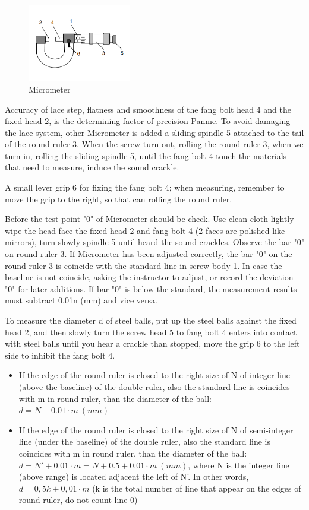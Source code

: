 \begin{figure}
    \includegraphics[width=0.4\textwidth]{figures/micrometer.png}
    \captionsetup{justification=raggedright}
    \caption{Micrometer}
    \label{fig:micrometer}
\end{figure}
Accuracy of lace step, flatness and smoothness of the fang bolt head 4 and the fixed head 2, is the determining factor of precision Panme. To avoid damaging the lace system, other Micrometer is added a sliding spindle 5 attached to the tail of the round ruler 3. When the screw turn out, rolling the round ruler 3, when we turn in, rolling the sliding spindle 5, until the fang bolt 4 touch the materials that need to measure, induce the sound crackle. \par
A small lever grip 6 for fixing the fang bolt 4; when measuring, remember to move the grip to the right, so that can rolling the round ruler. \par
Before the test point "0" of Micrometer should be check. Use clean cloth lightly wipe the head face the fixed head 2 and fang bolt 4 (2 faces are polished like mirrors), turn slowly spindle 5 until heard the sound crackles. Observe the bar "0" on round ruler 3. If Micrometer has been adjusted correctly, the bar "0" on the round ruler 3 is coincide with the standard line in screw body 1. In case the baseline is not coincide, asking the instructor to adjust, or record the deviation "0" for later additions. If bar "0" is below the standard, the measurement results must subtract 0,01n (mm) and vice versa. \par
To measure the diameter d of steel balls, put up the steel balls against the fixed head 2, and then slowly turn the screw head 5 to fang bolt 4 enters into contact with steel balls until you hear a crackle than stopped, move the grip 6 to the left side to inhibit the fang bolt 4.
\begin{itemize}
    \item If the edge of the round ruler is closed to the right size of N of integer line (above the baseline) of the double ruler, also the standard line is coincides with m in round ruler, than the diameter of the ball: $d = N + 0.01 \cdot m ~(mm)$
    \item If the edge of the round ruler is closed to the right size of N of semi-integer line (under the baseline) of the double ruler, also the standard line is coincides with m in round ruler, than the diameter of the ball: $d=N' + 0.01 \cdot m = N + 0.5 + 0.01 \cdot m \ (mm)$, where N is the integer line (above range) is located adjacent the left of N'. In other words, $d = 0,5k + 0,01\cdot m$ (k is the total number of line that appear on the edges of round ruler, do not count line 0)
\end{itemize}


